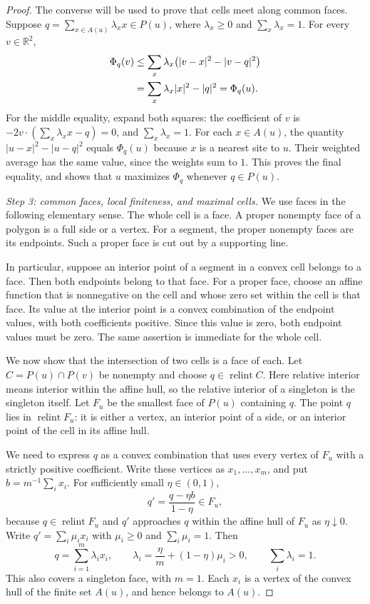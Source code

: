 \documentclass[11pt,a4paper]{article}
\theoremstyle{definition}
\theoremstyle{remark}
\newcommand{\R}{\mathbb{R}}
\DeclareMathOperator{\relint}{relint}
\begin{document}
\begin{proof}
The converse will be used to prove that cells meet along common faces.
Suppose
$q=\sum_{x\in A(u)}\lambda_xx\in P(u)$, where $\lambda_x\geq0$ and
$\sum_x\lambda_x=1$. For every $v\in\R^2$,
\begin{align}
\label{eq:variational-converse}
\Phi_q(v)
&\leq\sum_x\lambda_x\bigl(|v-x|^2-|v-q|^2\bigr)\notag\\
&=\sum_x\lambda_x|x|^2-|q|^2
=\Phi_q(u).
\end{align}
For the middle equality, expand both squares: the coefficient of $v$
is $-2v\cdot(\sum_x\lambda_xx-q)=0$, and
$\sum_x\lambda_x=1$. For each $x\in A(u)$, the quantity
$|u-x|^2-|u-q|^2$ equals $\Phi_q(u)$ because $x$ is a nearest site to $u$.
Their weighted average has the same value, since the weights sum to $1$.
This proves the final equality, and shows that $u$ maximizes
$\Phi_q$ whenever $q\in P(u)$.

\smallskip\noindent
\emph{Step 3: common faces, local finiteness, and maximal cells.}
We use faces in the following elementary sense. The whole cell is a
face. A proper nonempty face of a polygon is a full side or a vertex.
For a segment, the proper nonempty faces are its endpoints. Such a proper
face is cut out by a supporting line.

In particular, suppose an interior point of a segment in a convex cell
belongs to a face. Then both endpoints belong to that face.
For a proper face, choose an affine function that is nonnegative on the
cell and whose zero set within the cell is that face. Its value at the
interior point is a convex combination of the endpoint values, with both
coefficients positive. Since this value is zero, both endpoint values
must be zero. The same assertion is immediate for the whole cell.

We now show that the intersection of two cells is a face of each.
Let $C=P(u)\cap P(v)$ be nonempty and choose $q\in\relint C$.
Here relative interior means interior within the affine hull, so the
relative interior of a singleton is the singleton itself. Let $F_u$
be the smallest face of $P(u)$ containing $q$. The point $q$ lies in
$\relint F_u$: it is either a vertex, an interior point of a side, or
an interior point of the cell in its affine hull.

We need to express $q$ as a convex combination that uses every vertex
of $F_u$ with a strictly positive coefficient. Write these vertices as
$x_1,\ldots,x_m$, and put
$b=m^{-1}\sum_i x_i$. For sufficiently small $\eta\in(0,1)$,
\[
q'=\frac{q-\eta b}{1-\eta}\in F_u,
\]
because $q\in\relint F_u$ and $q'$ approaches $q$ within the affine hull
of $F_u$ as $\eta\downarrow0$.
Write $q'=\sum_i\mu_i x_i$ with $\mu_i\geq0$ and
$\sum_i\mu_i=1$. Then
\[
q=\sum_{i=1}^m\lambda_i x_i,
\qquad \lambda_i=\frac\eta m+(1-\eta)\mu_i>0,
\qquad\sum_i\lambda_i=1.
\]
This also covers a singleton face, with $m=1$.
Each $x_i$ is a vertex of the convex hull of the finite set $A(u)$,
and hence belongs to $A(u)$.


\end{proof}
\end{document}
